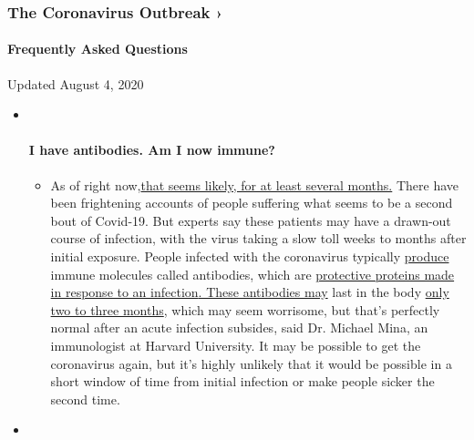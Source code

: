 \hypertarget{the-coronavirus-outbreak-}{%
\subsubsection{The Coronavirus Outbreak
›}\label{the-coronavirus-outbreak-}}

\hypertarget{frequently-asked-questions}{%
\paragraph{Frequently Asked
Questions}\label{frequently-asked-questions}}

Updated August 4, 2020

\begin{itemize}
\item ~
  \hypertarget{i-have-antibodies-am-i-now-immune}{%
  \paragraph{I have antibodies. Am I now
  immune?}\label{i-have-antibodies-am-i-now-immune}}

  \begin{itemize}
  \tightlist
  \item
    As of right
    now,\href{https://www.nytimes.com/2020/07/22/health/covid-antibodies-herd-immunity.html?action=click\&pgtype=Article\&state=default\&region=MAIN_CONTENT_3\&context=storylines_faq}{that
    seems likely, for at least several months.} There have been
    frightening accounts of people suffering what seems to be a second
    bout of Covid-19. But experts say these patients may have a
    drawn-out course of infection, with the virus taking a slow toll
    weeks to months after initial exposure. People infected with the
    coronavirus typically
    \href{https://www.nature.com/articles/s41586-020-2456-9}{produce}
    immune molecules called antibodies, which are
    \href{https://www.nytimes.com/2020/05/07/health/coronavirus-antibody-prevalence.html?action=click\&pgtype=Article\&state=default\&region=MAIN_CONTENT_3\&context=storylines_faq}{protective
    proteins made in response to an
    infection}\href{https://www.nytimes.com/2020/05/07/health/coronavirus-antibody-prevalence.html?action=click\&pgtype=Article\&state=default\&region=MAIN_CONTENT_3\&context=storylines_faq}{.
    These antibodies may} last in the body
    \href{https://www.nature.com/articles/s41591-020-0965-6}{only two to
    three months}, which may seem worrisome, but that's perfectly normal
    after an acute infection subsides, said Dr. Michael Mina, an
    immunologist at Harvard University. It may be possible to get the
    coronavirus again, but it's highly unlikely that it would be
    possible in a short window of time from initial infection or make
    people sicker the second time.
  \end{itemize}
\item ~
  \hypertarget{im-a-small-business-owner-can-i-get-relief}{%
}
\end{itemize}
